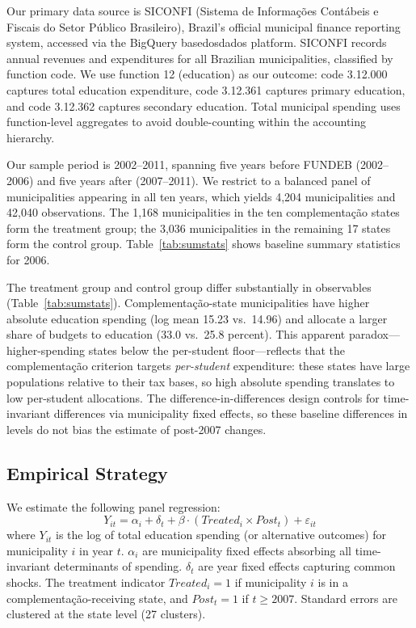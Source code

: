 \documentclass[12pt]{article}
\begin{document}
Our primary data source is SICONFI (Sistema de Informa\c{c}\~oes Cont\'abeis e Fiscais
do Setor P\'ublico Brasileiro), Brazil's official municipal finance reporting system,
accessed via the BigQuery basedosdados platform. SICONFI records annual revenues and
expenditures for all Brazilian municipalities, classified by function code. We use
function 12 (education) as our outcome: code 3.12.000 captures total education
expenditure, code 3.12.361 captures primary education, and code 3.12.362 captures
secondary education. Total municipal spending uses function-level aggregates to avoid
double-counting within the accounting hierarchy.

Our sample period is 2002--2011, spanning five years before FUNDEB (2002--2006) and
five years after (2007--2011). We restrict to a balanced panel of municipalities
appearing in all ten years, which yields 4,204 municipalities and 42,040 observations.
The 1,168 municipalities in the ten complementa\c{c}\~ao states form the treatment group;
the 3,036 municipalities in the remaining 17 states form the control group.
Table~\ref{tab:sumstats} shows baseline summary statistics for 2006.

The treatment group and control group differ substantially in observables (Table~\ref{tab:sumstats}).
Complementa\c{c}\~ao-state municipalities have higher absolute education spending
(log mean 15.23 vs.\ 14.96) and allocate a larger share of budgets to education
(33.0 vs.\ 25.8 percent). This apparent paradox---higher-spending states below the
per-student floor---reflects that the complementa\c{c}\~ao criterion targets
\textit{per-student} expenditure: these states have large populations relative to their
tax bases, so high absolute spending translates to low per-student allocations.
The difference-in-differences design controls for time-invariant differences via
municipality fixed effects, so these baseline differences in levels do not bias the
estimate of post-2007 changes.



\subsection{Empirical Strategy}

We estimate the following panel regression:
\begin{equation}
  Y_{it} = \alpha_i + \delta_t + \beta \cdot (\textit{Treated}_i \times \textit{Post}_t) + \varepsilon_{it}
  \label{eq:did}
\end{equation}
where $Y_{it}$ is the log of total education spending (or alternative outcomes) for
municipality $i$ in year $t$. $\alpha_i$ are municipality fixed effects absorbing
all time-invariant determinants of spending. $\delta_t$ are year fixed effects
capturing common shocks. The treatment indicator $\textit{Treated}_i = 1$ if
municipality $i$ is in a complementa\c{c}\~ao-receiving state, and $\textit{Post}_t = 1$
if $t \geq 2007$. Standard errors are clustered at the state level (27 clusters).
\end{document}
